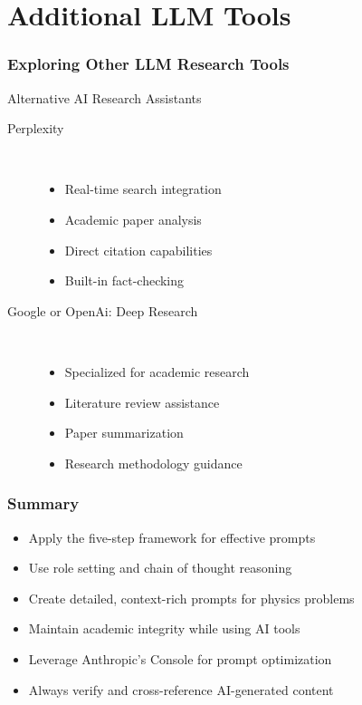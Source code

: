 \documentclass{beamer}
\begin{document}
\section{Additional LLM Tools}
\frame{\sectionpage}

\begin{frame}
\frametitle{Exploring Other LLM Research Tools}

\begin{block}{Alternative AI Research Assistants}
\begin{description}
\item[Perplexity] \hfill \\
   \begin{itemize}
   \item Real-time search integration
   \item Academic paper analysis
   \item Direct citation capabilities 
   \item Built-in fact-checking
   \end{itemize}
   
\item[Google or OpenAi: Deep Research] \hfill \\
   \begin{itemize}
   \item Specialized for academic research
   \item Literature review assistance
   \item Paper summarization
   \item Research methodology guidance
   \end{itemize}
\end{description}
\end{block}


\end{frame}


\begin{frame}
\frametitle{Summary}
\begin{itemize}
\item Apply the five-step framework for effective prompts
\item Use role setting and chain of thought reasoning
\item Create detailed, context-rich prompts for physics problems
\item Maintain academic integrity while using AI tools
\item Leverage Anthropic's Console for prompt optimization
\item Always verify and cross-reference AI-generated content
\end{itemize}
\end{frame}
\end{document}
